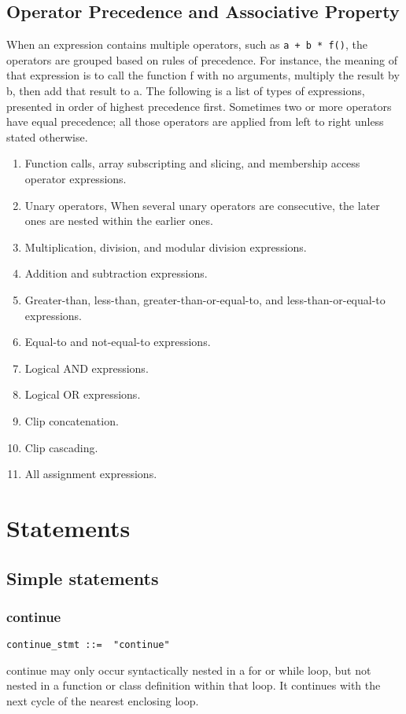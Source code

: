 \documentclass[12pt]{article}
\begin{document}
\subsection{Operator Precedence and Associative Property} %
When an expression contains multiple operators, such as \texttt{a + b * f()}, the operators are grouped based on rules of precedence. For instance, the meaning of that expression is to call the function f with no arguments, multiply the result by b, then add that result to a. 
The following is a list of types of expressions, presented in order of highest precedence first. Sometimes two or more operators have equal precedence; all those operators are applied from left to right unless stated otherwise.
\begin{enumerate}
\item Function calls, array subscripting and slicing, and membership access operator expressions.
\item Unary operators, When several unary operators are consecutive, the later ones are nested within the earlier ones.
\item Multiplication, division, and modular division expressions. 
\item  Addition and subtraction expressions. 
\item Greater-than, less-than, greater-than-or-equal-to, and less-than-or-equal-to expressions.
\item Equal-to and not-equal-to expressions.
\item Logical AND expressions.
\item Logical OR expressions.
\item Clip concatenation. 
\item Clip cascading.
\item All assignment expressions.
\end{enumerate}

%
\section{Statements}
\subsection{Simple statements}
\subsubsection{continue} %
\begin{lstlisting}[caption=continue]
continue_stmt ::=  "continue"
\end{lstlisting}
continue may only occur syntactically nested in a for or while loop, but not nested in a function or class definition within that loop. It continues with the next cycle of the nearest enclosing loop.\\
\end{document}
